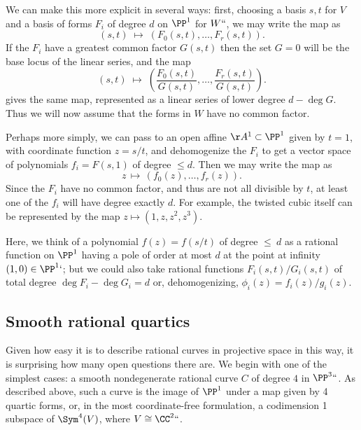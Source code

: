 We can make this more explicit in several ways: first, choosing a basis $s,t$ for $V$ and a basis of forms $F_i$ of degree $d$ on $\PP^1$ for $W` `$, we may write the map as
$$
(s,t) \; \mapsto \; \left(F_0(s,t), \dots, F_r(s,t)\right).
$$
If the $F_i$ have a greatest common factor $G(s,t)$ then the set $G=0$ will be the base locus
of the linear series, and the map
$$
(s,t) \; \mapsto \; \left( \frac{F_0(s,t)}{G(s,t)}, \dots, \frac{F_r(s,t)}{G(s,t)}\right).
$$
gives the same map, represented as a linear series of lower degree $d-\deg G$. Thus we
will now assume that the forms in $W$ have no common factor.

\begingroup \let\;\,
Perhaps 
more simply,
we can pass to an open affine 
$\AA^1\subset\PP^1$
given by $t=1$, 
with coordinate function $z = s/t$, and
dehomogenize the $F_i$ to get a vector space of polynomials $f_i = F(s,1)$ of degree $\leq d$. Then we may write the
map as
$$
z \; \mapsto \; (f_0(z), \dots, f_r(z)).
$$
Since the $F_i$ have no common factor, and 
thus
are not all divisible by $t$, at least one of the
$f_i$ will have degree exactly $d$.
For example, the twisted cubic itself can be represented by the map
$z \mapsto (1, z,z^2,z^3)$.

Here, we think of a polynomial $f(z) = f(s/t)$ of degree $\leq\ d$ 
as a rational function on $\PP^1$ having
a pole of order at most $d$ at the point at infinity $(1,0)\in \PP^1`$; but we could also take rational
functions $F_i(s,t)/G_i(s,t)$ of total degree $\deg F_i-\deg G_i = d$ or, dehomogenizing, $\phi_i(z) = f_i(z)/g_i(z)$.

\subsection*{Smooth rational quartics}

Given how easy it is to describe rational curves in projective space
%
in this way, it is surprising how many open questions there are. We
begin with 
one of the simplest cases: a smooth nondegenerate rational curve $C$ of degree $4$ in $\PP^3` `$.
As described above, such a curve is the image of $\PP^1$ under a map given by 4 quartic forms,
or, in the most coordinate-free formulation, a codimension 1 subspace of $\Sym^4(V)$, where
$V\cong \CC^2` `$. 

